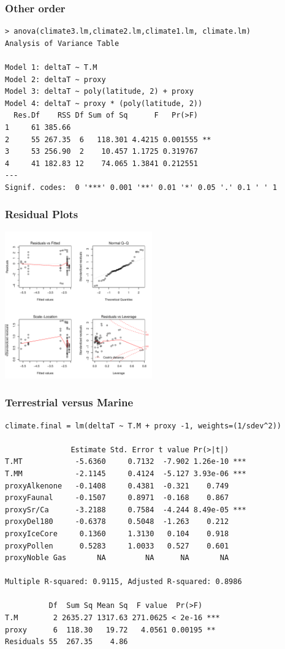 \documentclass[]{beamer}
\begin{document}
\begin{frame}[fragile]
  \frametitle{Other order}
 \begin{small}
\begin{verbatim}
> anova(climate3.lm,climate2.lm,climate1.lm, climate.lm)
Analysis of Variance Table

Model 1: deltaT ~ T.M
Model 2: deltaT ~ proxy
Model 3: deltaT ~ poly(latitude, 2) + proxy
Model 4: deltaT ~ proxy * (poly(latitude, 2))
  Res.Df    RSS Df Sum of Sq      F   Pr(>F)   
1     61 385.66                                
2     55 267.35  6   118.301 4.4215 0.001555 **
3     53 256.90  2    10.457 1.1725 0.319767   
4     41 182.83 12    74.065 1.3841 0.212551   
---
Signif. codes:  0 '***' 0.001 '**' 0.01 '*' 0.05 '.' 0.1 ' ' 1 
\end{verbatim}
  \end{small}
\end{frame}
\begin{frame} \frametitle{Residual Plots}

\centerline{\includegraphics[height=2.5in]{resid}}
\end{frame}

\begin{frame}[fragile]
  \frametitle{Terrestrial versus Marine}
\begin{small}
\begin{verbatim}
climate.final = lm(deltaT ~ T.M + proxy -1, weights=(1/sdev^2))

               Estimate Std. Error t value Pr(>|t|)    
T.MT            -5.6360     0.7132  -7.902 1.26e-10 ***
T.MM            -2.1145     0.4124  -5.127 3.93e-06 ***
proxyAlkenone   -0.1408     0.4381  -0.321    0.749    
proxyFaunal     -0.1507     0.8971  -0.168    0.867    
proxySr/Ca      -3.2188     0.7584  -4.244 8.49e-05 ***
proxyDel180     -0.6378     0.5048  -1.263    0.212    
proxyIceCore     0.1360     1.3130   0.104    0.918    
proxyPollen      0.5283     1.0033   0.527    0.601    
proxyNoble Gas       NA         NA      NA       NA    

Multiple R-squared: 0.9115,	Adjusted R-squared: 0.8986 

          Df  Sum Sq Mean Sq  F value  Pr(>F)    
T.M        2 2635.27 1317.63 271.0625 < 2e-16 ***
proxy      6  118.30   19.72   4.0561 0.00195 ** 
Residuals 55  267.35    4.86                     
\end{verbatim}
\end{small}
\end{frame}
\end{document}
